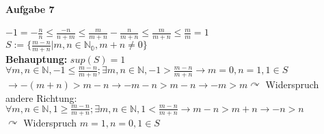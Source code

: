 \documentclass[10pt,a4paper]{scrartcl}
\begin{document}
\paragraph*{Aufgabe 7}
\begin{tabbing}
$-1=-\frac{n}{n}\leq\frac{-n}{n+m}\leq\frac{m}{m+n} -\frac{n}{m+n}\leq\frac{m}{m+n}\leq\frac{m}{m} =1$\\
$S:=\{\frac{m-n}{m+n} | m,n\in\mathbb{N_{0}} ,m+n\neq 0\}$\\
\textbf{Behauptung:} $sup(S)=1$\\
$\forall m,n\in \mathbb{N}, -1\leq\frac{m-n}{m+n}; \exists m,n\in \mathbb{N}, -1>\frac{m-n}{m+n}\rightarrow m=0,n=1, 1\in S$\\$
\rightarrow -(m+n)>m-n\rightarrow -m-n>m-n\rightarrow -m>m\curvearrowright$ Widerspruch\\
andere Richtung: $\forall m,n\in\mathbb{N}, 1\geq\frac{m-n}{m+n}; \exists m,n\in \mathbb{N}, 1<\frac{m-n}{m+n}\rightarrow m-n>m+n \rightarrow -n>n$\\
$\curvearrowright$ Widerspruch $m=1, n=0, 1\in S$
\end{tabbing}
\end{document}
